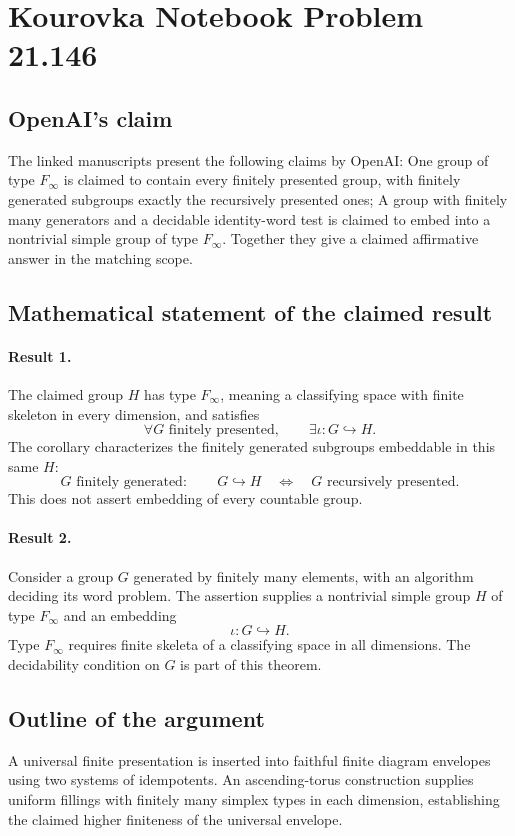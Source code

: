 \documentclass[11pt]{article}
\begin{document}
\section*{Kourovka Notebook Problem 21.146}

\subsection{OpenAI's claim}
The linked manuscripts present the following claims by OpenAI: One group of type $F_\infty$ is claimed to contain every finitely presented group, with finitely generated subgroups exactly the recursively presented ones; A group with finitely many generators and a decidable identity-word test is claimed to embed into a nontrivial simple group of type $F_\infty$. Together they give a claimed affirmative answer in the matching scope.

\subsection{Mathematical statement of the claimed result}
\paragraph{Result 1.} The claimed group \(H\) has type \(F_\infty\), meaning a classifying space with finite skeleton in every dimension, and satisfies
\[
 \forall G\text{ finitely presented},\qquad\exists\iota:G\hookrightarrow H.
\]
The corollary characterizes the finitely generated subgroups embeddable in this same \(H\):
\[
 G\text{ finitely generated}:\qquad G\hookrightarrow H
 \quad\Longleftrightarrow\quad G\text{ recursively presented}.
\]
This does not assert embedding of every countable group.

\paragraph{Result 2.} Consider a group \(G\) generated by finitely many elements, with an algorithm deciding its word problem. The assertion supplies a nontrivial simple group \(H\) of type \(F_\infty\) and an embedding
\[
 \iota:G\hookrightarrow H.
\]
Type \(F_\infty\) requires finite skeleta of a classifying space in all dimensions. The decidability condition on \(G\) is part of this theorem.

\subsection{Outline of the argument}
A universal finite presentation is inserted into faithful finite diagram envelopes using two systems of idempotents. An ascending-torus construction supplies uniform fillings with finitely many simplex types in each dimension, establishing the claimed higher finiteness of the universal envelope.
\end{document}
